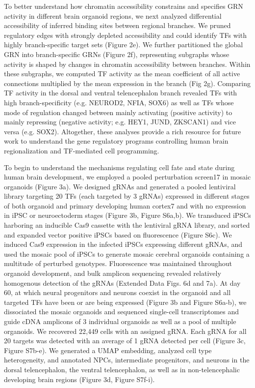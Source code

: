 To better understand how chromatin accessibility constrains and specifies GRN activity in different brain organoid regions, we next analyzed differential accessibility of inferred binding sites between regional branches. We pruned regulatory edges with strongly depleted accessibility and could identify TFs with highly branch-specific target sets (Figure 2e). We further partitioned the global GRN into branch-specific GRNs (Figure 2f), representing subgraphs whose activity is shaped by changes in chromatin accessibility between branches. Within these subgraphs, we computed TF activity as the mean coefficient of all active connections multiplied by the mean expression in the branch (Fig 2g). Comparing TF activity in the dorsal and ventral telencephalon branch revealed TFs with high branch-specificity (e.g. NEUROD2, NFIA, SOX6) as well as TFs whose mode of regulation changed between mainly activating (positive activity) to mainly repressing (negative activity; e.g. HEY1, JUND, ZKSCAN1) and vice versa (e.g. SOX2). Altogether, these analyses provide a rich resource for future work to understand the gene regulatory programs controlling human brain regionalization and TF-mediated cell programming.


To begin to understand the mechanisms regulating cell fate and state during human brain development, we employed a pooled perturbation screen17 in mosaic organoids (Figure 3a). We designed gRNAs and generated a pooled lentiviral library targeting 20 TFs (each targeted by 3 gRNAs) expressed in different stages of both organoid and primary developing human cortex7 and with no expression in iPSC or neuroectoderm stages (Figure 3b, Figure S6a,b). We transduced iPSCs harboring an inducible Cas9 cassette with the lentiviral gRNA library, and sorted and expanded vector positive iPSCs based on fluorescence (Figure S6c). We induced Cas9 expression in the infected iPSCs expressing different gRNAs, and used the mosaic pool of iPSCs to generate mosaic cerebral organoids containing a multitude of perturbed genotypes. Fluorescence was maintained throughout organoid development, and bulk amplicon sequencing revealed relatively homogenous detection of the gRNAs (Extended Data Figs. 6d and 7a). At day 60, at which neural progenitors and neurons coexist in the organoid and all targeted TFs have been or are being expressed (Figure 3b and Figure S6a-b), we dissociated the mosaic organoids and sequenced single-cell transcriptomes and guide cDNA amplicons of 3 individual organoids as well as a pool of multiple organoids. We recovered 22,449 cells with an assigned gRNA. Each gRNA for all 20 targets was detected with an average of 1 gRNA detected per cell (Figure 3c, Figure S7b-e). We generated a UMAP embedding, analyzed cell type heterogeneity, and annotated NPCs, intermediate progenitors, and neurons in the dorsal telencephalon, the ventral telencephalon, as well as in non-telencephalic developing brain regions (Figure 3d, Figure S7f-i).

